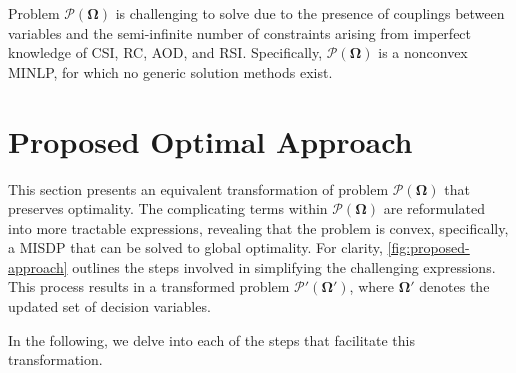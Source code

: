 \documentclass[10pt,journal,compsoc]{IEEEtran}
\theoremstyle{myremark}
\theoremstyle{myexample}
\begin{document}
Problem $ \mathcal{P} \left( \boldsymbol{\Omega} \right) $ is challenging to solve due to the presence of couplings between variables and the semi-infinite number of constraints arising from imperfect knowledge of \gls{CSI}, \gls{RC}, \gls{AOD}, and \gls{RSI}. Specifically, $ \mathcal{P} \left( \boldsymbol{\Omega} \right) $ is a nonconvex \gls{MINLP}, for which no generic solution methods exist.

 







\section{Proposed Optimal Approach} \label{sec:proposed-approach}



This section presents an equivalent transformation of problem $ \mathcal{P} \left( \boldsymbol{\Omega} \right) $ that preserves optimality. The complicating terms within $ \mathcal{P} \left( \boldsymbol{\Omega} \right) $ are reformulated into more tractable expressions, revealing that the problem is convex, specifically, a \gls{MISDP} that can be solved to global optimality. For clarity, \cref{fig:proposed-approach} outlines the steps involved in simplifying the challenging expressions. This process results in a transformed problem $ \mathcal{P}' \left( \boldsymbol{\Omega}' \right) $, where $ \boldsymbol{\Omega}' $ denotes the updated set of decision variables. 

In the following, we delve into each of the steps that facilitate this transformation.




 
\end{document}
